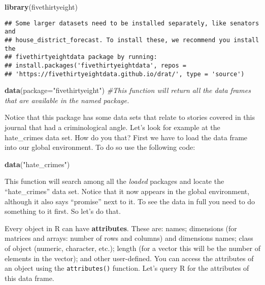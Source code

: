 \documentclass[
]{book}
\newenvironment{Shaded}{\begin{snugshade}}{\end{snugshade}}
\newcommand{\AttributeTok}[1]{\textcolor[rgb]{0.13,0.29,0.53}{#1}}
\newcommand{\CommentTok}[1]{\textcolor[rgb]{0.56,0.35,0.01}{\textit{#1}}}
\newcommand{\FunctionTok}[1]{\textcolor[rgb]{0.13,0.29,0.53}{\textbf{#1}}}
\newcommand{\NormalTok}[1]{#1}
\newcommand{\StringTok}[1]{\textcolor[rgb]{0.31,0.60,0.02}{#1}}
\begin{document}
\begin{Shaded}
\begin{Highlighting}[]
\FunctionTok{library}\NormalTok{(fivethirtyeight)}
\end{Highlighting}
\end{Shaded}

\begin{verbatim}
## Some larger datasets need to be installed separately, like senators and
## house_district_forecast. To install these, we recommend you install the
## fivethirtyeightdata package by running:
## install.packages('fivethirtyeightdata', repos =
## 'https://fivethirtyeightdata.github.io/drat/', type = 'source')
\end{verbatim}

\begin{Shaded}
\begin{Highlighting}[]
\FunctionTok{data}\NormalTok{(}\AttributeTok{package=}\StringTok{"fivethirtyeight"}\NormalTok{) }\CommentTok{\#This function will return all the data frames that are available in the named package.}
\end{Highlighting}
\end{Shaded}

Notice that this package has some data sets that relate to stories covered in this journal that had a criminological angle. Let's look for example at the hate\_crimes data set. How do you that? First we have to load the data frame into our global environment. To do so use the following code:

\begin{Shaded}
\begin{Highlighting}[]
\FunctionTok{data}\NormalTok{(}\StringTok{"hate\_crimes"}\NormalTok{)}
\end{Highlighting}
\end{Shaded}

This function will search among all the \emph{loaded} packages and locate the ``hate\_crimes'' data set. Notice that it now appears in the global environment, although it also says ``promise'' next to it. To see the data in full you need to do something to it first. So let's do that.

Every object in R can have \textbf{attributes}. These are: names; dimensions (for matrices and arrays: number of rows and columns) and dimensions names; class of object (numeric, character, etc.); length (for a vector this will be the number of elements in the vector); and other user-defined. You can access the attributes of an object using the \texttt{attributes()} function. Let's query R for the attributes of this data frame.
\end{document}
